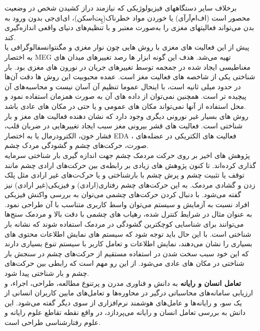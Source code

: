 برخلاف سایر دستگاههای فیزیولوژیکی که نیازمند دراز کشیدن شخص‌ در وضعیت محصور است (اف‌ام‌آرآی) یا خوردن مواد خطرناک(پِت‌اسکن)، ای‌ای‌جی بدون ورود به بدن می‌تواند فعالیتهای مغزی را به‌صورت‌ معتبر و با تنظیم‌های دنیای واقعی
اندازه‌گیری کند.
\\
پیش از این فعالیت های مغزی با روش هایی چون نوار مغزی و مگنتوانسفالوگرافی یا به اختصار MEG
تهیه می‌شد. هدف این گونه ابزار ها رصد تغییر‌های میدان های مغناطیسی ایجاد شده در جمجمه توسط تغییر‌های جریان در نورون های مغزی بود.
بار شناختی یکی از شاخصه های فعالیت مغز است. عمده محبوبیت این روش ها دقت آن‌ها در حدود میلی ثانیه است، با اینحال عموما تنظیم آن آسان نیست و محاسبه‌های آن پیچیده تر است. همچنین نمی‌توان از داده های آن به صورت همزمان استفاده نمود و محل استفاده از آنها نمی‌تواند مکان های عمومی و یا حتی در مکان های عادی باشد.
\\
روش های بسیار غیر نورونی دیگری وجود دارد که نشان دهنده فعالیت های مغز و بار شناختی است. فعالیت های قشر بیرونی مغز سبب ایجاد تغییرهایی در ضربان قلب، فشار خون، الکترودرمال یا به اختصار EDA
، فعالیت های الکتریکی در عضله‌‌های صورت، حرکت‌های چشم و گشودگی مردک چشم.
\\
پژوهش های اخیر بر روی حرکت مردمک چشم جهت اندازه گیری بار شناختی سرمایه گذاری کرده‌اند.
تا کنون پژوهش های زیادی بر رابطه‌ی بین حرکت‌های ارادی چشم مانند توقف یا تثبیت چشم و پرش چشم با بارشناختی و یا حرک‌ت‌های غیر ارادی مثل پلک زدن و گشادی مردمک. به این حرکت‌های چشم رفتاری(ارادی) و فیزیکی(غیر ارادی) نیز گفته می‌شود.
با دنبال کردن حرکت‌های چشمی می‌توان به بررسی واکنش فیزیکی افراد نسبت به آزمایش  و سیستم می‌توان واسط کاربری متناسب با آن طراحی نمود.
به عنوان مثال در شرایط کنترل شده، رهیاب های چشمی با دقت بالا و مردمک سنج‌ها می‌توانند برای شناسایی کوچکترین گشودگی در مردمک استفاده شوند که نشانه بار شناختی است.
\cite{rafiqi2015pupilware}
با این حال باید توجه شود که سیستم های نمایش اطلاعات محتوی های بسیاری را نشان می‌دهند، نمایش اطلاعات و تعامل کاربر با سیستم تنوع بسیاری دارند که این خود سبب سخت شدن در استفاده مستقیم از حرکت‌های چشم در سنجش بار شناختی در مکان های عادی می‌شود. از این رو مهم است که رابطی بین حرکت‌های چشم و بار شناختی پیدا شود.
\cite{zagermann2016measuring}
\\
\textbf{تعامل انسان و رایانه}
 به دانش و فناوری مدرن و پرتنوع مطالعه، طراحی، اجراء، و ارزیابی سامانه‌های محاسباتی درگیر در محاوره‌ها و تعامل‌های مابین کاربران انسانی از یک سو، و رایانه‌ها و عامل‌های هوشمند نرم‌افزاری از سوی دیگر گفته می‌شود. این دانش به بررسی تعامل انسان و رایانه می‌پردازد، در واقع نقطه تقاطع علوم رایانه و علوم رفتار‌شناسی طراحی است.

